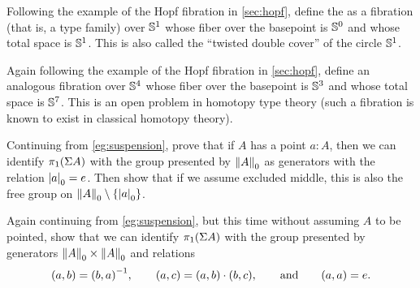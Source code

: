 \documentclass[hott-all.tex]{subfiles}
\begin{document}
% 
\begin{ex}
  Following the example of the Hopf fibration in \cref{sec:hopf}, define the 
as a fibration (that is, a type family) over $\Sn ^1$ whose fiber over the basepoint is $\Sn ^0$ and whose total space is $\Sn ^1$.  This is also called the ``twisted double cover'' of the circle $\Sn ^1$.
\end{ex}
% 
\begin{ex}
Again following the example of the Hopf fibration in \cref{sec:hopf}, define an analogous fibration over $\Sn ^4$ whose fiber over the basepoint is $\Sn ^3$ and whose total space is $\Sn ^7$.  This is an open problem in homotopy type theory (such a fibration is known to exist in classical homotopy theory).
\end{ex}
% 
\begin{ex}
  Continuing from \cref{eg:suspension}, prove that if $A$ has a point $a:A$, then we can identify $\pi_1(\susp A)$ with the group presented by $\trunc0A$ as generators with the relation $\tproj0a = e$.
  Then show that if we assume excluded middle, this is also the free group on $\trunc0 A \setminus \{\tproj0 a \}$.
\end{ex}
% 
\begin{ex}
  Again continuing from \cref{eg:suspension}, but this time without assuming $A$ to be pointed, show that we can identify $\pi_1(\susp A)$ with the group presented by generators $\trunc0A \times \trunc0A$ and relations
  \begin{equation*}
    (a,b) = \opp{(b,a)},
    \qquad
    (a,c) = (a,b)\cdot (b,c),
    \qquad\text{and}\qquad
    (a,a) = e.
  \end{equation*}
\end{ex}
% 
% 
% 
% 
\end{document}
